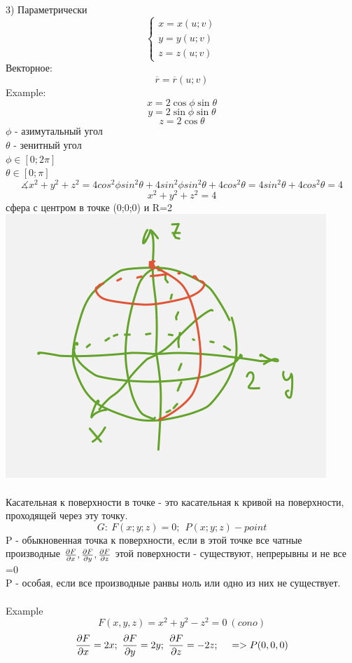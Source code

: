 \documentclass{article}
\begin{document}
3) Параметрически
\begin{equation*}
    \begin{cases}
        x = x(u;v)\\
        y = y(u;v)\\
        z = z(u;v)
    \end{cases}
\end{equation*}
Векторное:
\begin{equation*}
    \overline{r} = \overline{r}(u;v)
\end{equation*}
Example:
\begin{equation*}
    x = 2\cos\phi\sin\theta 
\end{equation*}
\begin{equation*}
    y = 2\sin\phi\sin\theta 
\end{equation*}
\begin{equation*}
    z = 2\cos\theta 
\end{equation*}
$\phi$ - азимутальный угол\\
$\theta$ - зенитный угол\\
$\phi \in [0;2\pi]$\\
$\theta \in [0;\pi]$\\
\begin{equation*}
    \measuredangle x^2+y^2+z^2 = 4cos^2\phi sin^2\theta+4sin^2\phi sin^2\theta + 4 cos^2\theta = 4sin^2\theta +4cos^2\theta = 4
\end{equation*}
\begin{equation*}
    x^2+y^2+z^2 = 4
\end{equation*}
сфера с центром в точке (0;0;0) и R=2\\
\includegraphics[width=.3\textwidth]{sphere.png}
\\ \\
Касательная к поверхности в точке - это касательная к кривой на поверхности, проходящей через эту точку.
\begin{equation*}
    G:\ F(x;y;z) = 0;\ \ P(x;y;z) - point
\end{equation*}
P - обыкновенная точка к поверхности, если в этой точке все чатные производные $\pdv{F}{x}, \pdv{F}{y}, \pdv{F}{z} $ этой поверхности - существуют, непрерывны и не все =0
\\
P - особая, если все производные ранвы ноль или одно из них не существует.
\\ \\
Example
\begin{equation*}
    F(x,y,z) = x^2+y^2-z^2 = 0\ (cono)
\end{equation*}
\begin{equation*}
    \pdv{F}{x} = 2x;\  \pdv{F}{y}= 2y;\ \pdv{F}{z}= -2z;\ \ \ \ => P(0,0,0)
\end{equation*}
\end{document}
